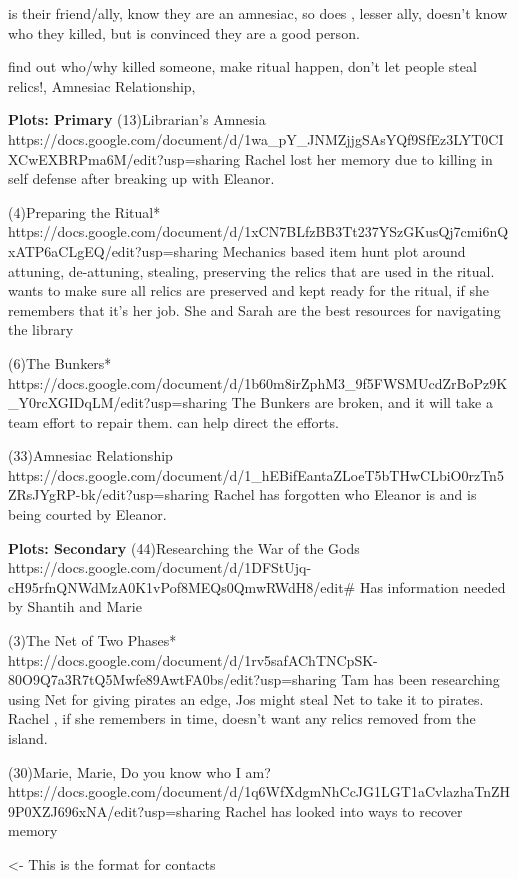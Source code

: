 \documentclass[char]{GL2020}
\begin{document}
\cEthics{} is their friend/ally, know they are an amnesiac, so does \cInterpol{}, lesser ally, doesn't know who they killed, but is convinced they are a good person.

find out who/why killed someone, make ritual happen, don't let people steal relics!, Amnesiac Relationship, 


\textbf{Plots: Primary}
(13)Librarian’s Amnesia
https://docs.google.com/document/d/1wa_pY_JNMZjjgSAsYQf9SfEz3LYT0CIXCwEXBRPma6M/edit?usp=sharing
Rachel lost her memory due to killing in self defense after breaking up with Eleanor.  

(4)Preparing the Ritual*
https://docs.google.com/document/d/1xCN7BLfzBB3Tt237YSzGKusQj7cmi6nQxATP6aCLgEQ/edit?usp=sharing
Mechanics based item hunt plot around attuning, de-attuning, stealing, preserving the relics that are used in the ritual.  \cLibrarian{} wants to make sure all relics are preserved and kept ready for the ritual, if she remembers that it's her job. She and Sarah are the best resources for navigating the library

(6)The Bunkers*
https://docs.google.com/document/d/1b60m8irZphM3_9f5FWSMUcdZrBoPz9K_Y0rcXGIDqLM/edit?usp=sharing
The Bunkers are broken, and it will take a team effort to repair them.  \cLibrarian{} can help direct the efforts.

(33)Amnesiac Relationship
https://docs.google.com/document/d/1_hEBifEantaZLoeT5bTHwCLbiO0rzTn5ZRsJYgRP-bk/edit?usp=sharing
Rachel has forgotten who Eleanor is and is being courted by Eleanor.


\textbf{Plots: Secondary}
(44)Researching the War of the Gods
https://docs.google.com/document/d/1DFStUjq-cH95rfnQNWdMzA0K1vPof8MEQs0QmwRWdH8/edit#
Has information needed by Shantih and Marie

(3)The Net of Two Phases*
https://docs.google.com/document/d/1rv5safAChTNCpSK-80O9Q7a3R7tQ5Mwfe89AwtFA0bs/edit?usp=sharing
Tam \cPirate{} has been researching using Net for giving pirates an edge, Jos \cPirateChild{} might steal Net to take it to pirates.  Rachel \cLibrarian{}, if she remembers in time, doesn't want any relics removed from the island.  

(30)Marie, Marie, Do you know who I am?
https://docs.google.com/document/d/1q6WfXdgmNhCcJG1LGT1aCvlazhaTnZH9P0XZJ696xNA/edit?usp=sharing
Rachel has looked into ways to recover memory

\begin{itemz}[Goals]
	\item 
\end{itemz}

\begin{itemz}[Notes]
	\item 
\end{itemz}

\begin{contacts}
	\contact{\cTest{}} <- This is the format for contacts 
\end{contacts}
\end{document}
